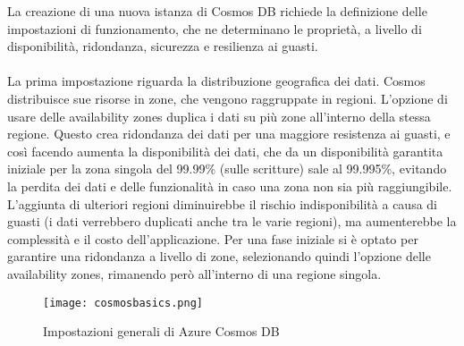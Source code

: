 La creazione di una nuova istanza di Cosmos DB
richiede la definizione delle impostazioni di funzionamento,
che ne determinano le proprietà, a livello di disponibilità, ridondanza, sicurezza e resilienza ai guasti.\\
\\
La prima impostazione riguarda la distribuzione geografica dei dati.
Cosmos distribuisce sue risorse in zone, che vengono raggruppate in regioni.
L'opzione di usare delle availability zones duplica i dati su più zone all'interno della stessa regione.
Questo crea ridondanza dei dati per una maggiore resistenza ai guasti,
e così facendo aumenta la disponibilità dei dati,
che da un disponibilità garantita iniziale per la zona singola del 99.99\% (sulle scritture) sale al 99.995\%,
evitando la perdita dei dati e delle funzionalità in caso una zona non sia più raggiungibile.
L'aggiunta di ulteriori regioni diminuirebbe il rischio indisponibilità a causa di guasti
(i dati verrebbero duplicati anche tra le varie regioni),
ma aumenterebbe la complessità e il costo dell'applicazione.
Per una fase iniziale si è optato per garantire una ridondanza a livello di zone,
selezionando quindi l'opzione delle availability zones,
rimanendo però all'interno di una regione singola.\\

\begin{figure}[h!]
    \centering
    \texttt{[image: cosmosbasics.png]}
    \caption{Impostazioni generali di Azure Cosmos DB}
\end{figure}

